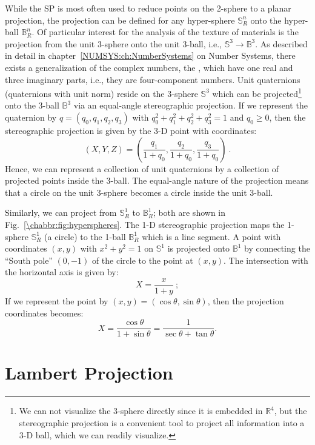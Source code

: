 While the SP is most often used to reduce points on the 2-sphere to a planar projection, the projection can be defined for any hyper-sphere $\mathbb{S}^n_R$ onto the hyper-ball $\mathbb{B}^n_R$.  Of particular interest for the analysis of the texture of materials is the projection from the unit 3-sphere onto the unit 3-ball, i.e., $\mathbb{S}^3\rightarrow\mathbb{B}^3$. As described in detail in chapter~\ref{NUMSYS:ch:NumberSystems} on Number Systems, there exists a generalization of the complex numbers, the , which have one real and three imaginary parts, i.e., they are four-component numbers.  Unit quaternions (quaternions with unit norm) reside on the 3-sphere $\mathbb{S}^3$ which can be projected\footnote{We can not visualize the 3-sphere directly since it is embedded in $\mathbb{R}^4$, but the stereographic projection is a convenient tool to project all information into a 3-D ball, which we can readily visualize.} onto the 3-ball $\mathbb{B}^3$ via an equal-angle stereographic projection.  If we represent the quaternion by $q=(q_0,q_1,q_2,q_3)$ with $q_0^2+q_1^2+q_2^2+q_3^2=1$ and $q_0\ge 0$, then the stereographic projection is given by the 3-D point with coordinates:
\[
	(X,Y,Z) = \left(\frac{q_1}{1+q_0},\frac{q_2}{1+q_0},\frac{q_3}{1+q_0}\right)\ .
\]
Hence, we can represent a collection of unit quaternions by a collection of projected points inside the 3-ball. The equal-angle nature of the projection means that a circle on the unit 3-sphere becomes a circle inside the unit 3-ball.

Similarly, we can project from $\mathbb{S}^1_R$ to $\mathbb{B}^1_R$; both are shown in Fig.~\ref{\chabbr:fig:hyperspheres}.  The 1-D stereographic projection maps the 1-sphere $\mathbb{S}^1_R$ (a circle) to the 1-ball $\mathbb{B}^1_R$ which is a line segment. A point with coordinates $(x,y)$ with $x^2+y^2=1$ on $\mathbb{S}^1$ is projected onto $\mathbb{B}^1$ by connecting  the ``South pole'' $(0,-1)$ of the circle to the point at $(x,y)$.  The intersection with the horizontal axis is given by:
\[
	X = \frac{x}{1+y}\ ;
\]
If we represent the point by $(x,y)=(\cos\theta,\sin\theta)$, then the projection coordinates becomes:
\[
	X = \frac{\cos\theta}{1+\sin\theta} = \frac{1}{\sec\theta+\tan\theta}.
\]
% 

\section{Lambert Projection}
\label{\chabbr:sec:lambertproj}


